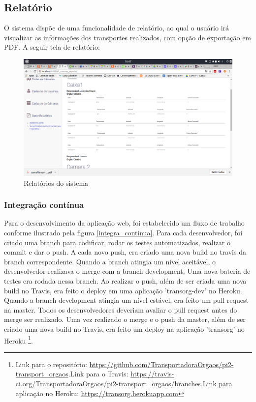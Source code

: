 \subsection{Relatório}
	O sistema dispõe de uma funcionalidade de relatório, ao qual o usuário irá visualizar as informações dos transportes realizados, com opção de exportação em PDF.
	A seguir tela de relatório:
\begin{figure}[H]
\centering
\includegraphics[width=16cm]{figuras/relatorio_software.png}
\caption{Relatórios do sistema}
\end{figure}

\subsubsection{Integração contínua}

Para o desenvolvimento da aplicação web, foi estabelecido um fluxo de trabalho conforme ilustrado pela figura \ref{integra_continua}. Para cada desenvolvedor, foi criado uma branch para codificar, rodar os testes automatizados, realizar o commit e dar o push. A cada novo push, era criado uma nova build no travis da branch correspondente. Quando a branch atingia um nível aceitável, o desenvolvedor realizava o merge com a branch development. Uma nova bateria de testes era rodada nessa branch. Ao realizar o push, além de ser criada uma nova build no Travis, era feito o deploy em uma aplicação 'transorg-dev' no Heroku. Quando a branch development atingia um nível estável, era feito um pull request na master. Todos os desenvolvedores deveriam avaliar o pull request antes do merge ser realizado. Uma vez realizado o merge e o push da master, além de ser criado uma nova build no Travis, era feito um deploy na aplicação 'transorg' no Heroku \footnote{Link para o repositório: \href{https://github.com/TransportadoraOrgaos/pi2-transport_orgaos}{https://github.com/TransportadoraOrgaos/pi2-transport\_orgaos}.\newline Link para o Travis: \href{https://travis-ci.org/TransportadoraOrgaos/pi2-transport\_orgaos/branches}{https://travis-ci.org/TransportadoraOrgaos/pi2-transport\_orgaos/branches}.\newline Link para aplicação no Heroku: \href{https://transorg.herokuapp.com}{https://transorg.herokuapp.com}}.

